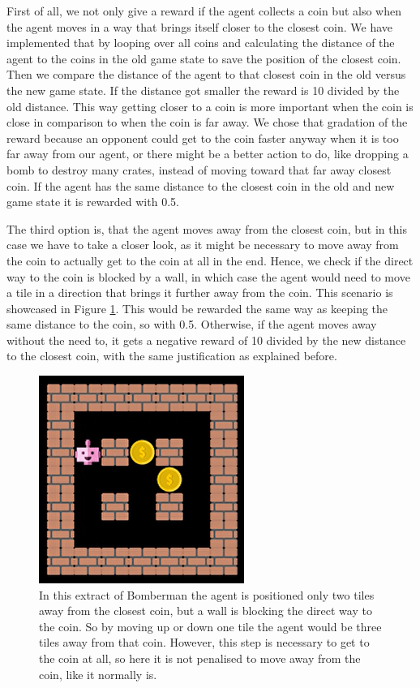 \noindent First of all, we not only give a reward if the agent collects a coin but also when the agent moves in a way that brings itself closer to the closest coin. We have implemented that by looping over all coins and calculating the distance of the agent to the coins in the old game state to save the position of the closest coin. Then we compare the distance of the agent to that closest coin in the old versus the new game state. If the distance got smaller the reward is 10 divided by the old distance. This way getting closer to a coin is more important when the coin is close in comparison to when the coin is far away. We chose that gradation of the reward because an opponent could get to the coin faster anyway when it is too far away from our agent, or there might be a better action to do, like dropping a bomb to destroy many crates, instead of moving toward that far away closest coin. If the agent has the same distance to the closest coin in the old and new game state it is rewarded with 0.5. 

The third option is, that the agent moves away from the closest coin, but in this case we have to take a closer look, as it might be necessary to move away from the coin to actually get to the coin at all in the end. Hence, we check if the direct way to the coin is blocked by a wall, in which case the agent would need to move a tile in a direction that brings it further away from the coin. This scenario is showcased in Figure \ref{fig:coin-blocked}. This would be rewarded the same way as keeping the same distance to the coin, so with 0.5. Otherwise, if the agent moves away without the need to, it gets a negative reward of 10 divided by the new distance to the closest coin, with the same justification as explained before.

\begin{figure}[H]
	\centering
	\includegraphics{images/coin_blocked.png}
	\caption{In this extract of Bomberman the agent is positioned only two tiles away from the closest coin, but a wall is blocking the direct way to the coin. So by moving up or down one tile the agent would be three tiles away from that coin. However, this step is necessary to get to the coin at all, so here it is not penalised to move away from the coin, like it normally is.}
	\label{fig:coin-blocked}
\end{figure}

